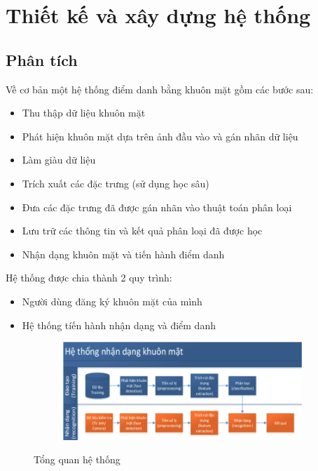 \chapter{Thiết kế và xây dựng hệ thống}
\label{cha:chap3}

\section{Phân tích}
Về cơ bản một hệ thống điểm danh bằng khuôn mặt gồm các bước sau:
\begin{itemize}
    \item Thu thập dữ liệu khuôn mặt
    \item Phát hiện khuôn mặt dựa trên ảnh đầu vào và gán nhãn dữ liệu
    \item Làm giàu dữ liệu
    \item Trích xuất các đặc trưng (sử dụng học sâu)
    \item Đưa các đặc trưng đã được gán nhãn vào thuật toán phân loại
    \item Lưu trữ các thông tin và kết quả phân loại đã được học
    \item Nhận dạng khuôn mặt và tiến hành điểm danh
\end{itemize}
\newpage
Hệ thống được chia thành 2 quy trình:
\begin{itemize}
    \item Người dùng đăng ký khuôn mặt của mình
    \item Hệ thống tíến hành nhận dạng và điểm danh
\end{itemize}

\begin{figure}
    \begin{subfigure}{1.\textwidth}
        \includegraphics[width=1.\linewidth]{Chapters/items/chap3_1.jpg}
        \label{fig:chap3_1}
    \end{subfigure}
    \caption{Tổng quan hệ thống}
\end{figure}

